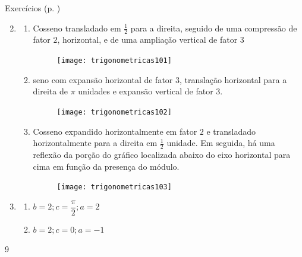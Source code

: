 \begin{answer}{Exercícios (p. \pageref{trig-exercises2})}
{\exerciselist
\begin{enumerate}\setcounter{enumi}{1}
\item 
\begin{enumerate}
\item Cosseno transladado em $\frac{1}{2}$ para a direita, seguido de uma compressão de fator $2$, horizontal, e de uma ampliação vertical de fator $3$
\begin{figure}[H]
\centering

\texttt{[image: trigonometricas101]}
\end{figure}

\item seno com expansão horizontal de fator $3$, translação horizontal para a direita de $\pi$ unidades e expansão vertical de fator $3$.
\begin{figure}[H]
\centering

\texttt{[image: trigonometricas102]}
\end{figure}

\item Cosseno expandido horizontalmente em fator $2$ e transladado horizontalmente para a direita em $\frac{1}{2}$ unidade. Em seguida, há uma reflexão da porção do gráfico localizada abaixo do eixo horizontal para cima em função da presença do módulo.
\begin{figure}[H]
\centering

\texttt{[image: trigonometricas103]}
\end{figure}
\end{enumerate}
\item 
\begin{enumerate}
\item $b=2; c=\dfrac{\pi}{2}; a=2$
\item $b=2; c=0; a=-1$
\end{enumerate}

\end{enumerate}
}{9}
\end{answer}
\exercise
{}\label{trig-exercises2}


